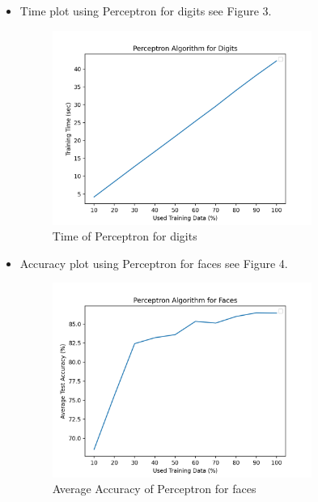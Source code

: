 \documentclass{article}
\begin{document}
\begin{itemize}
    \item Time plot using Perceptron for digits see Figure 3.
    \begin{figure}
        \centering
        \includegraphics[width=0.8\textwidth]{perDiTime.png}
        \caption{Time of Perceptron for digits}
    \end{figure}
    
    \item Accuracy plot using Perceptron for faces see Figure 4.
    \begin{figure}
        \centering
        \includegraphics[width=0.8\textwidth]{perFa.png}
        \caption{Average Accuracy of Perceptron for faces}
    \end{figure}
    

\end{itemize}
\end{document}
